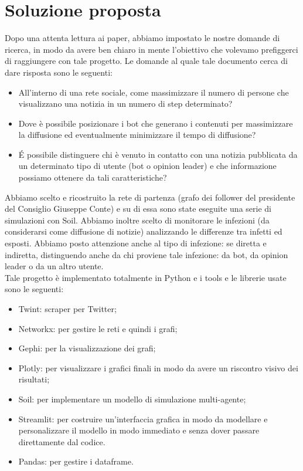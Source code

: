 \section{Soluzione proposta}
Dopo una attenta lettura ai paper, abbiamo impostato le nostre domande di ricerca, in modo da avere ben chiaro in mente l'obiettivo che volevamo prefiggerci di raggiungere con tale progetto. Le domande al quale tale documento cerca di dare risposta sono le seguenti:
\begin{itemize}
  \item All'interno di una rete sociale, come massimizzare il numero di persone che visualizzano una notizia in un numero di step determinato?
  \item Dove è possibile posizionare i bot che generano i contenuti per massimizzare la diffusione ed eventualmente minimizzare il tempo di diffusione?
  \item \'E possibile distinguere chi è venuto in contatto con una notizia pubblicata da un determinato tipo di utente (bot o opinion leader) e che informazione possiamo ottenere da tali caratteristiche?
\end{itemize}
Abbiamo scelto e ricostruito la rete di partenza (grafo dei follower del presidente del Consiglio Giuseppe Conte) e su di essa sono state eseguite una serie di simulazioni con Soil. Abbiamo inoltre scelto di monitorare le infezioni (da considerarsi come diffusione di notizie) analizzando le differenze tra infetti ed esposti. Abbiamo posto attenzione anche al tipo di infezione: se diretta e indiretta, distinguendo anche da chi proviene tale infezione: da bot, da opinion leader o da un altro utente.
\\
Tale progetto è implementato totalmente in Python e i tools e le librerie usate sono le seguenti:
\begin{itemize}
\item Twint: scraper per Twitter;
\item Networkx: per gestire le reti e quindi i grafi;
\item Gephi: per la visualizzazione dei grafi;
\item Plotly: per visualizzare i grafici finali in modo da avere un riscontro visivo dei risultati;
\item Soil: per implementare un modello di simulazione multi-agente;
\item Streamlit: per costruire un'interfaccia grafica in modo da modellare e personalizzare il modello in modo immediato e senza dover passare direttamente dal codice.
\item Pandas: per gestire i dataframe.
\end{itemize}
